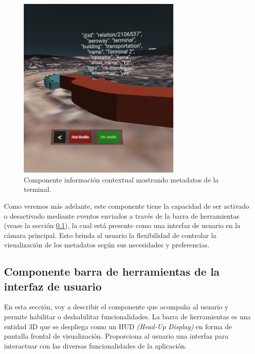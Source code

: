 \documentclass[a4paper, 11pt]{book}
\begin{document}
\begin{figure}[h]
  \centering
  \includegraphics[width=8cm, keepaspectratio]{img/tooltip.jpg}
  \caption{Componente información contextual mostrando metadatos de la terminal.}
  \label{fig:tooltip}
\end{figure}
Como veremos más adelante, este componente tiene la capacidad de ser activado o desactivado mediante eventos enviados a través de la barra de herramientas (vease la sección \ref{subsec:toolbar3d}), la cual está presente como una interfaz de usuario en la cámara principal. Esto brinda al usuario la flexibilidad de controlar la visualización de los metadatos según sus necesidades y preferencias.

\subsection{Componente barra de herramientas de la interfaz de usuario}
\label{subsec:toolbar3d}
En esta sección, voy a describir el componente que acompaña al usuario y permite habilitar o deshabilitar funcionalidades. La barra de herramientas es una entidad 3D que se despliega como un \textsc{\gls{HUD}} \emph{(Head-Up Display)} en forma de pantalla frontal de visualización. Proporciona al usuario una interfaz para interactuar con las diversas funcionalidades de la aplicación.
\end{document}
